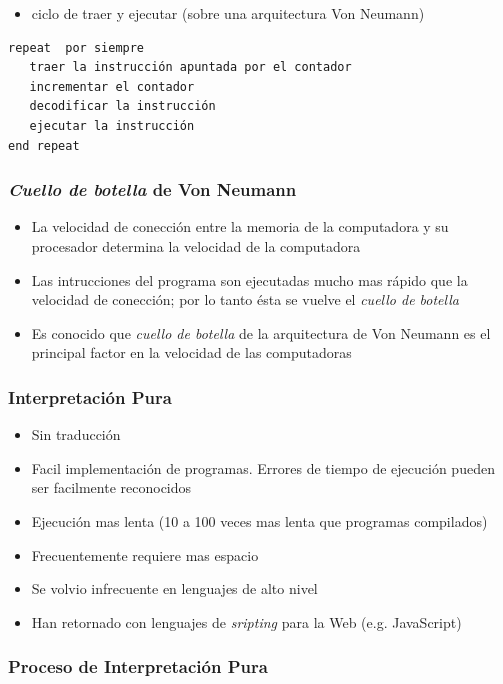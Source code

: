 \documentclass[11pt]{article}
\begin{document}
\begin{itemize}
\item ciclo de traer y ejecutar (sobre una arquitectura Von Neumann)
\end{itemize}

\begin{verbatim}
repeat  por siempre
   traer la instrucción apuntada por el contador
   incrementar el contador
   decodificar la instrucción
   ejecutar la instrucción
end repeat
\end{verbatim}

\subsubsection*{\emph{Cuello de botella} de Von Neumann}
\label{sec:orgheadline20}

\begin{itemize}
\item La velocidad de conección entre la memoria de la computadora y su
procesador determina la velocidad de la computadora
\item Las intrucciones del programa son ejecutadas mucho mas rápido que la
velocidad de conección; por lo tanto ésta se vuelve el \emph{cuello de botella}
\item Es conocido que \emph{cuello de botella} de la arquitectura de Von
Neumann es el principal factor en la velocidad de las computadoras
\end{itemize}

\subsubsection*{Interpretación Pura}
\label{sec:orgheadline21}
\begin{itemize}
\item Sin traducción
\item Facil implementación de programas. Errores de tiempo de ejecución
pueden ser facilmente reconocidos
\item Ejecución mas lenta (10 a 100 veces mas lenta que programas compilados)
\item Frecuentemente requiere mas espacio
\item Se volvio infrecuente en lenguajes de alto nivel
\item Han retornado con lenguajes de \emph{sripting} para la Web (e.g. JavaScript)
\end{itemize}

\subsubsection*{Proceso de Interpretación Pura}
\label{sec:orgheadline22}
\end{document}
